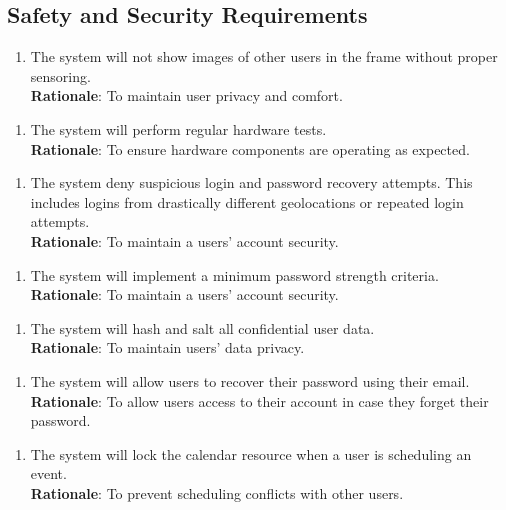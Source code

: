 \documentclass{article}
\begin{document}
\subsection{Safety and Security Requirements}
\begin{enumerate}[{SR}1. ]
    \item The system will not show images of other users in the frame without proper sensoring.\\
    \textbf{Rationale}: To maintain user privacy and comfort. 
\end{enumerate}
\begin{enumerate}[{SR}2. ]
    \item The system will perform regular hardware tests.\\
    \textbf{Rationale}: To ensure hardware components are operating as expected.
\end{enumerate}  
\begin{enumerate}[{SR}3. ]
    \item The system deny suspicious login and password recovery attempts. This includes logins from drastically different geolocations or repeated login attempts.\\
    \textbf{Rationale}: To maintain a users' account security. 
\end{enumerate} 
\begin{enumerate}[{SR}4. ]
    \item The system will implement a minimum password strength criteria.\\
    \textbf{Rationale}: To maintain a users' account security. 
\end{enumerate} 
\begin{enumerate}[{SR}5. ]
    \item The system will hash and salt all confidential user data.\\
    \textbf{Rationale}: To maintain users' data privacy. 
\end{enumerate} 
\begin{enumerate}[{SR}6. ]
    \item The system will allow users to recover their password using their email.\\
    \textbf{Rationale}: To allow users access to their account in case they forget their password. 
\end{enumerate}
\begin{enumerate}[{SR}7. ]
    \item The system will lock the calendar resource when a user is scheduling an event.\\
    \textbf{Rationale}: To prevent scheduling conflicts with other users.
\end{enumerate}  
\end{document}
